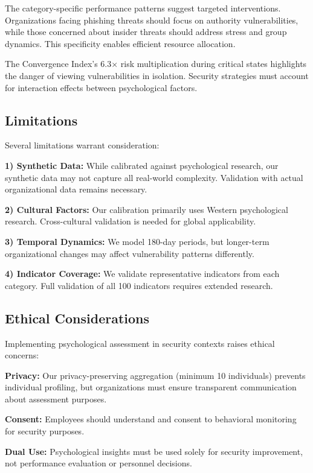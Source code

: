 \documentclass[10pt,twocolumn]{IEEEtran}
\begin{document}
The category-specific performance patterns suggest targeted interventions. Organizations facing phishing threats should focus on authority vulnerabilities, while those concerned about insider threats should address stress and group dynamics. This specificity enables efficient resource allocation.

The Convergence Index's 6.3× risk multiplication during critical states highlights the danger of viewing vulnerabilities in isolation. Security strategies must account for interaction effects between psychological factors.

\subsection{Limitations}

Several limitations warrant consideration:

\textbf{1) Synthetic Data:} While calibrated against psychological research, our synthetic data may not capture all real-world complexity. Validation with actual organizational data remains necessary.

\textbf{2) Cultural Factors:} Our calibration primarily uses Western psychological research. Cross-cultural validation is needed for global applicability.

\textbf{3) Temporal Dynamics:} We model 180-day periods, but longer-term organizational changes may affect vulnerability patterns differently.

\textbf{4) Indicator Coverage:} We validate representative indicators from each category. Full validation of all 100 indicators requires extended research.

\subsection{Ethical Considerations}

Implementing psychological assessment in security contexts raises ethical concerns:

\textbf{Privacy:} Our privacy-preserving aggregation (minimum 10 individuals) prevents individual profiling, but organizations must ensure transparent communication about assessment purposes.

\textbf{Consent:} Employees should understand and consent to behavioral monitoring for security purposes.

\textbf{Dual Use:} Psychological insights must be used solely for security improvement, not performance evaluation or personnel decisions.
\end{document}
